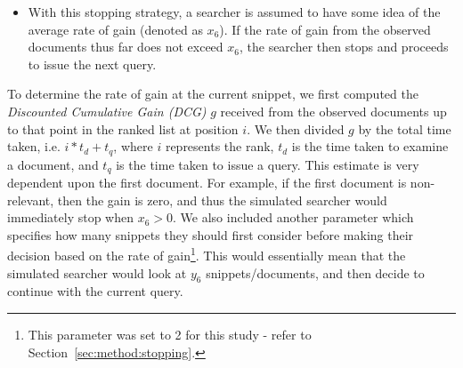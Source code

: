 \begin{itemize}
    \item[\blueboxbold{SS8}] With this stopping strategy, a searcher is assumed to have some idea of the average rate of gain (denoted as $x_6$). If the rate of gain from the observed documents thus far does not exceed $x_6$, the searcher then stops and proceeds to issue the next query.
\end{itemize}

To determine the rate of gain at the current snippet, we first computed the \emph{Discounted Cumulative Gain (DCG)} $g$ received from the observed documents up to that point in the ranked list at position $i$. We then divided $g$ by the total time taken, i.e. $i*t_d +t_q$, where $i$ represents the rank, $t_d$ is the time taken to examine a document, and $t_q$ is the time taken to issue a query. This estimate is very dependent upon the first document. For example, if the first document is non-relevant, then the gain is zero, and thus the simulated searcher would immediately stop when $x_6>0$. We also included another parameter which specifies how many snippets they should first consider before making their decision based on the rate of gain\footnote{\scriptsize{This parameter was set to 2 for this study - refer to Section~\ref{sec:method:stopping}.}}. This would essentially mean that the simulated searcher would look at $y_6$ snippets/documents, and then decide to continue with the current query.

